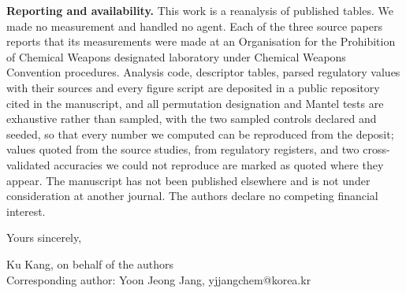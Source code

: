 \documentclass[11pt,letterpaper]{article}
\begin{document}
\textbf{Reporting and availability.} This work is a reanalysis of published
tables. We made no measurement and handled no agent. Each of the three source
papers reports that its measurements were made at an Organisation for the
Prohibition of Chemical Weapons designated laboratory under Chemical Weapons
Convention procedures. Analysis code, descriptor tables,
parsed regulatory values with their sources and every figure script are
deposited in a public repository cited in the manuscript, and all permutation
designation and Mantel tests are exhaustive rather than sampled, with the
two sampled controls declared and seeded, so that every number we computed can
be reproduced from the deposit; values quoted from the source studies, from
regulatory registers, and two cross-validated accuracies we could not reproduce
are marked as quoted where they appear. The manuscript has not been published elsewhere
and is not under consideration at another journal. The authors declare no
competing financial interest.

\vspace{2pt}

Yours sincerely,

\vspace{10pt}

Ku Kang, on behalf of the authors\\
{\small Corresponding author: Yoon Jeong Jang, yjjangchem@korea.kr}
\end{document}

